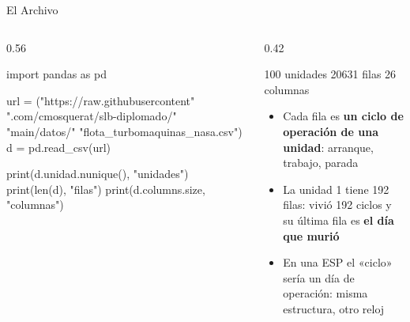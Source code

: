 \documentclass[aspectratio=169, 11pt]{beamer}
\begin{document}
\begin{frame}[fragile, shrink=22]{El Archivo}
  \vspace{-4pt}
  \begin{columns}[T]
    \begin{column}{0.56\textwidth}
      \begin{pyblock}
import pandas as pd

url = ("https://raw.githubusercontent"
  ".com/cmosquerat/slb-diplomado/"
  "main/datos/"
  "flota_turbomaquinas_nasa.csv")
d = pd.read_csv(url)

print(d.unidad.nunique(), "unidades")
print(len(d), "filas")
print(d.columns.size, "columnas")
      \end{pyblock}
    \end{column}
    \begin{column}{0.42\textwidth}
      \vspace{2pt}
      \begin{outputblock}
100 unidades
20631 filas
26 columnas
      \end{outputblock}
      \vspace{6pt}
      {\footnotesize\color{textMuted}
      \begin{itemize}\setlength{\itemsep}{5pt}
        \item[{\color{arcaRed}\scriptsize\faArrowRight}]
          Cada fila es \textbf{un ciclo de operación de una unidad}:
          arranque, trabajo, parada
        \item[{\color{arcaRed}\scriptsize\faArrowRight}]
          La unidad 1 tiene 192 filas: vivió 192 ciclos y su última fila
          es \textbf{el día que murió}
        \item[{\color{arcaRed}\scriptsize\faArrowRight}]
          En una ESP el «ciclo» sería un día de operación: misma
          estructura, otro reloj
      \end{itemize}}
    \end{column}
  \end{columns}
\end{frame}
\end{document}
